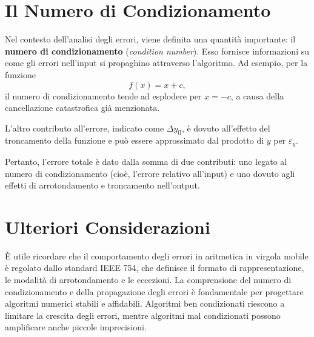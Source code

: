 \documentclass[letterpaper,12pt]{article}
\begin{document}
\section*{Il Numero di Condizionamento}

Nel contesto dell'analisi degli errori, viene definita una quantità importante: il \textbf{numero di condizionamento} (\emph{condition number}). Esso fornisce informazioni su come gli errori nell'input si propaghino attraverso l'algoritmo. Ad esempio, per la funzione
\[
f(x) = x + c,
\]
il numero di condizionamento tende ad esplodere per $x=-c$, a causa della cancellazione catastrofica già menzionata.

L'altro contributo all'errore, indicato come $\Delta y_{\operatorname{fl}}$, è dovuto all'effetto del troncamento della funzione e può essere approssimato dal prodotto di $y$ per $\varepsilon_y$.

Pertanto, l'errore totale è dato dalla somma di due contributi: uno legato al numero di condizionamento (cioè, l'errore relativo all'input) e uno dovuto agli effetti di arrotondamento e troncamento nell'output.

\section*{Ulteriori Considerazioni}

È utile ricordare che il comportamento degli errori in aritmetica in virgola mobile è regolato dallo standard IEEE 754, che definisce il formato di rappresentazione, le modalità di arrotondamento e le eccezioni. La comprensione del numero di condizionamento e della propagazione degli errori è fondamentale per progettare algoritmi numerici stabili e affidabili. Algoritmi ben condizionati riescono a limitare la crescita degli errori, mentre algoritmi mal condizionati possono amplificare anche piccole imprecisioni.
\end{document}
